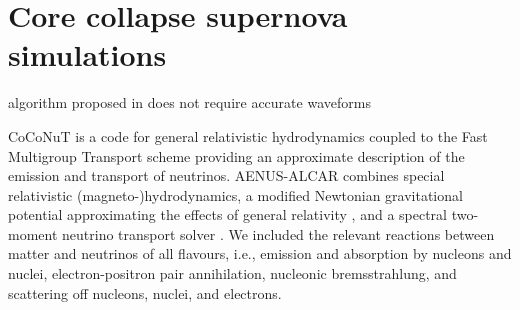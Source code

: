 \section{Core collapse supernova simulations}
\label{sec:simulations}



 algorithm proposed in  does not require accurate
waveforms  

CoCoNuT
\citep{Dimmelmeier:2002,Dimmelmeier:2005} is a code for general
relativistic hydrodynamics coupled to the Fast Multigroup Transport
scheme \citep{Mueller_Janka_2015_FMT} providing an approximate
description of the emission and transport of neutrinos.  AENUS-ALCAR
\citep{Just_et_al__2015__mnras__Anewmultidimensionalenergy-dependenttwo-momenttransportcodeforneutrino-hydrodynamics}
combines special relativistic (magneto-)hydrodynamics, a modified
Newtonian gravitational potential approximating the effects of general
relativity \citep{Marek_etal__2006__AA__TOV-potential}, and a spectral
two-moment neutrino transport solver
\citep{Just_et_al__2015__mnras__Anewmultidimensionalenergy-dependenttwo-momenttransportcodeforneutrino-hydrodynamics}.
We included the relevant reactions between matter and neutrinos of all
flavours, i.e., emission and absorption by nucleons and nuclei,
electron-positron pair annihilation, nucleonic bremsstrahlung, and
scattering off nucleons, nuclei, and electrons.

